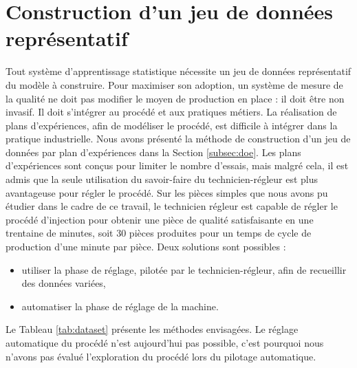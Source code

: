 \section{Construction d'un jeu de données représentatif} \label{ch:dataset} \label{sec:dataset_construction}
Tout système d'apprentissage statistique nécessite un jeu de données représentatif du modèle à construire.
Pour maximiser son adoption, un système de mesure de la qualité ne doit pas modifier le moyen de production en place : il doit être non invasif.
Il doit s'intégrer au procédé et aux pratiques métiers.
La réalisation de plans d'expériences, afin de modéliser le procédé, est difficile à intégrer dans la pratique industrielle.
Nous avons présenté la méthode de construction d'un jeu de données par plan d'expériences dans la Section \ref{subsec:doe}.
Les plans d'expériences sont conçus pour limiter le nombre d'essais, mais malgré cela, il est admis que la seule utilisation du savoir-faire du technicien-régleur est plus avantageuse pour régler le procédé.
Sur les pièces simples que nous avons pu étudier dans le cadre de ce travail, le technicien régleur est capable de régler le procédé d'injection pour obtenir une pièce de qualité satisfaisante en une trentaine de minutes, soit 30 pièces produites pour un temps de cycle de production d'une minute par pièce.
Deux solutions sont possibles :
\begin{itemize}
	\item utiliser la phase de réglage, pilotée par le technicien-régleur, afin de recueillir des données variées,
	\item automatiser la phase de réglage de la machine.
\end{itemize}

Le Tableau \ref{tab:dataset} présente les méthodes envisagées.
Le réglage automatique du procédé n'est aujourd'hui pas possible, c'est pourquoi nous n'avons pas évalué l'exploration du procédé lors du pilotage automatique.

